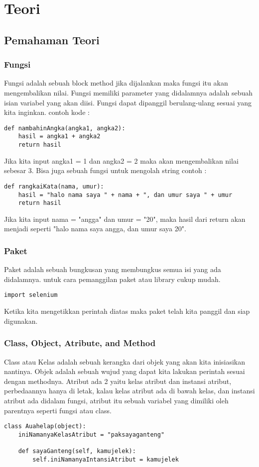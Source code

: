 \chapter{Teori}

\section{Pemahaman Teori}

\subsection{Fungsi}
Fungsi adalah sebuah block method jika dijalankan maka fungsi itu akan mengembalikan nilai. Fungsi memiliki parameter yang didalamnya adalah sebuah isian variabel yang akan diisi. Fungsi dapat dipanggil berulang-ulang sesuai yang kita inginkan. contoh kode :
\begin{verbatim}
def nambahinAngka(angka1, angka2):
	hasil = angka1 + angka2
	return hasil
\end{verbatim}
Jika kita input angka1 = 1 dan angka2 = 2 maka akan mengembalikan nilai sebesar 3. Bisa juga sebuah fungsi untuk mengolah string contoh :
\begin{verbatim}
def rangkaiKata(nama, umur):
	hasil = "halo nama saya " + nama + ", dan umur saya " + umur
	return hasil
\end{verbatim}
Jika kita input nama = "angga" dan umur = "20", maka hasil dari return akan menjadi seperti "halo nama saya angga, dan umur saya 20".

\subsection{Paket}
Paket adalah sebuah bungkusan yang membungkus semua isi yang ada didalamnya. untuk cara pemanggilan paket atau library cukup mudah.
\begin{verbatim}
import selenium
\end{verbatim}
Ketika kita mengetikkan perintah diatas maka paket telah kita panggil dan siap digunakan.

\subsection{Class, Object, Atribute, and Method}
Class atau Kelas adalah sebuah kerangka dari objek yang akan kita inisiasikan nantinya. Objek adalah sebuah wujud yang dapat kita lakukan perintah sesuai dengan methodnya. Atribut ada 2 yaitu kelas atribut dan instansi atribut, perbedaannya hanya di letak, kalau kelas atribut ada di bawah kelas, dan instansi atribut ada didalam fungsi, atribut itu sebuah variabel yang dimiliki oleh parentnya seperti fungsi atau class.
\begin{verbatim}
class Auahelap(object):
	iniNamanyaKelasAtribut = "paksayaganteng"
	
	def sayaGanteng(self, kamujelek):
		self.iniNamanyaIntansiAtribut = kamujelek
\end{verbatim}

